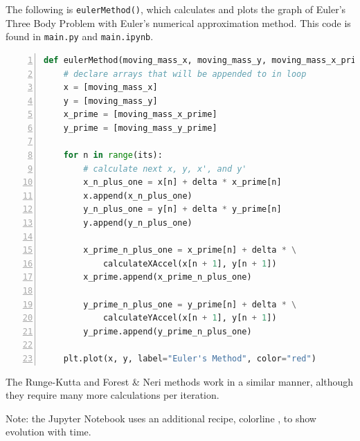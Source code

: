 \documentclass[preprint,titlepage,preprintnumbers,amsmath,amssymb,aps,11pt]{revtex4-2}
\begin{document}
The following is \texttt{eulerMethod()}, which calculates and plots the graph of Euler's Three Body Problem with Euler's numerical approximation method. This code is found in \texttt{main.py} and \texttt{main.ipynb}.

\begin{lstlisting}[language=Python, numbers=left, breaklines=true]
def eulerMethod(moving_mass_x, moving_mass_y, moving_mass_x_prime, moving_mass_y_prime, its, delta):
    # declare arrays that will be appended to in loop
    x = [moving_mass_x]
    y = [moving_mass_y]
    x_prime = [moving_mass_x_prime]
    y_prime = [moving_mass_y_prime]

    for n in range(its):
        # calculate next x, y, x', and y'
        x_n_plus_one = x[n] + delta * x_prime[n]
        x.append(x_n_plus_one)
        y_n_plus_one = y[n] + delta * y_prime[n]
        y.append(y_n_plus_one)

        x_prime_n_plus_one = x_prime[n] + delta * \
            calculateXAccel(x[n + 1], y[n + 1])
        x_prime.append(x_prime_n_plus_one)

        y_prime_n_plus_one = y_prime[n] + delta * \
            calculateYAccel(x[n + 1], y[n + 1])
        y_prime.append(y_prime_n_plus_one)

    plt.plot(x, y, label="Euler's Method", color="red")
\end{lstlisting}

The Runge-Kutta and Forest \& Neri methods work in a similar manner, although they require many more calculations per iteration.

Note: the Jupyter Notebook uses an additional recipe, colorline \cite{Colorline}, to show evolution with time.


\end{document}
